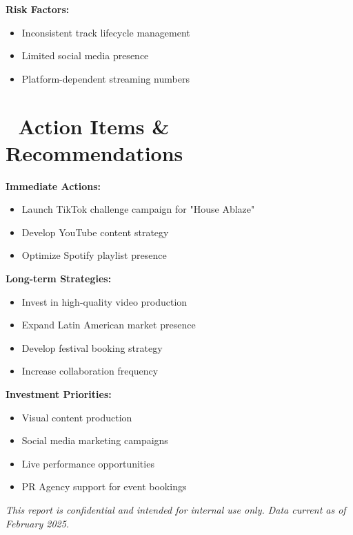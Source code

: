 \documentclass{article}
\begin{document}
\textbf{Risk Factors:}
\begin{itemize}
\item Inconsistent track lifecycle management
\item Limited social media presence
\item Platform-dependent streaming numbers
\end{itemize}

\section*{🚀 Action Items \& Recommendations}

\textbf{Immediate Actions:}
\begin{itemize}
\item Launch TikTok challenge campaign for "House Ablaze"
\item Develop YouTube content strategy
\item Optimize Spotify playlist presence
\end{itemize}

\textbf{Long-term Strategies:}
\begin{itemize}
\item Invest in high-quality video production
\item Expand Latin American market presence
\item Develop festival booking strategy
\item Increase collaboration frequency
\end{itemize}

\textbf{Investment Priorities:}
\begin{itemize}
\item Visual content production
\item Social media marketing campaigns
\item Live performance opportunities
\item PR Agency support for event bookings
\end{itemize}

\vspace{0.5cm}
\textit{This report is confidential and intended for internal use only. Data current as of February 2025.}
\end{document}
